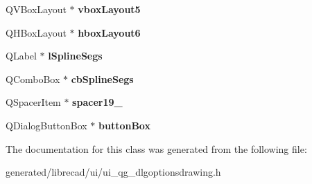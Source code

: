 \begin{DoxyCompactItemize}
\item 
\hypertarget{classUi__QG__DlgOptionsDrawing_a28a25763ccb23a1b31c8987561a2b786}{Q\-V\-Box\-Layout $\ast$ {\bfseries vbox\-Layout5}}\label{classUi__QG__DlgOptionsDrawing_a28a25763ccb23a1b31c8987561a2b786}

\item 
\hypertarget{classUi__QG__DlgOptionsDrawing_a9627bf30a3d46bac1260fe0abdfda4d3}{Q\-H\-Box\-Layout $\ast$ {\bfseries hbox\-Layout6}}\label{classUi__QG__DlgOptionsDrawing_a9627bf30a3d46bac1260fe0abdfda4d3}

\item 
\hypertarget{classUi__QG__DlgOptionsDrawing_a775863e944b7cad877d299c14303438b}{Q\-Label $\ast$ {\bfseries l\-Spline\-Segs}}\label{classUi__QG__DlgOptionsDrawing_a775863e944b7cad877d299c14303438b}

\item 
\hypertarget{classUi__QG__DlgOptionsDrawing_aa690ac1e3a78e82678f425aa25e5b783}{Q\-Combo\-Box $\ast$ {\bfseries cb\-Spline\-Segs}}\label{classUi__QG__DlgOptionsDrawing_aa690ac1e3a78e82678f425aa25e5b783}

\item 
\hypertarget{classUi__QG__DlgOptionsDrawing_adc727645a861877e479d70faf48ad4fa}{Q\-Spacer\-Item $\ast$ {\bfseries spacer19\-\_}}\label{classUi__QG__DlgOptionsDrawing_adc727645a861877e479d70faf48ad4fa}

\item 
\hypertarget{classUi__QG__DlgOptionsDrawing_ac4dd2a6c9f82f0fb567d0dc76f781052}{Q\-Dialog\-Button\-Box $\ast$ {\bfseries button\-Box}}\label{classUi__QG__DlgOptionsDrawing_ac4dd2a6c9f82f0fb567d0dc76f781052}

\end{DoxyCompactItemize}


The documentation for this class was generated from the following file\-:\begin{DoxyCompactItemize}
\item 
generated/librecad/ui/ui\-\_\-qg\-\_\-dlgoptionsdrawing.\-h\end{DoxyCompactItemize}
